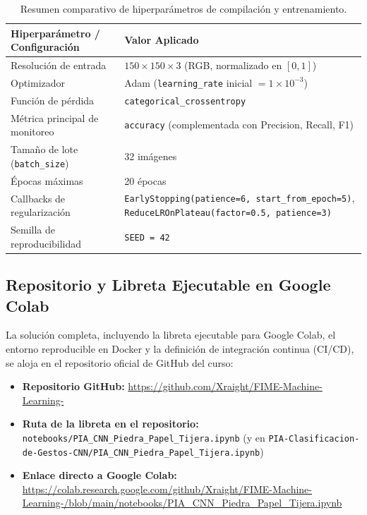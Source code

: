 \begin{table}[H]
    \centering
    \caption{Resumen comparativo de hiperparámetros de compilación y entrenamiento.}
    \label{tab:hiperparametros}
    \begin{tabular}{ll}
        \toprule
        \textbf{Hiperparámetro / Configuración} & \textbf{Valor Aplicado} \\
        \midrule
        Resolución de entrada & $150 \times 150 \times 3$ (RGB, normalizado en $[0, 1]$) \\
        Optimizador & Adam (\texttt{learning\_rate} inicial $= 1\times 10^{-3}$) \\
        Función de pérdida & \texttt{categorical\_crossentropy} \\
        Métrica principal de monitoreo & \texttt{accuracy} (complementada con Precision, Recall, F1) \\
        Tamaño de lote (\texttt{batch\_size}) & 32 imágenes \\
        Épocas máximas & 20 épocas \\
        Callbacks de regularización & \texttt{EarlyStopping(patience=6, start\_from\_epoch=5)}, \texttt{ReduceLROnPlateau(factor=0.5, patience=3)} \\
        Semilla de reproducibilidad & \texttt{SEED = 42} \\
        \bottomrule
    \end{tabular}
\end{table}

\subsection{Repositorio y Libreta Ejecutable en Google Colab}

La solución completa, incluyendo la libreta ejecutable para Google Colab, el entorno reproducible en Docker y la definición de integración continua (CI/CD), se aloja en el repositorio oficial de GitHub del curso:
\begin{itemize}
    \item \textbf{Repositorio GitHub:} \url{https://github.com/Xraight/FIME-Machine-Learning-}
    \item \textbf{Ruta de la libreta en el repositorio:} \texttt{notebooks/PIA\_CNN\_Piedra\_Papel\_Tijera.ipynb} (y en \texttt{PIA-Clasificacion-de-Gestos-CNN/PIA\_CNN\_Piedra\_Papel\_Tijera.ipynb})
    \item \textbf{Enlace directo a Google Colab:} \url{https://colab.research.google.com/github/Xraight/FIME-Machine-Learning-/blob/main/notebooks/PIA_CNN_Piedra_Papel_Tijera.ipynb}
\end{itemize}

